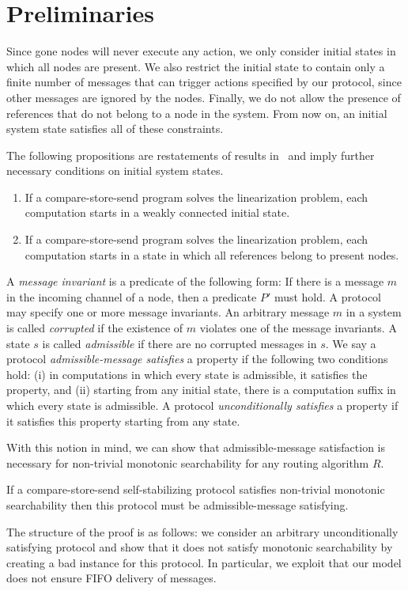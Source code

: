 \documentclass[a4paper,USenglish]{lipics}
\begin{document}
\section{Preliminaries}
\label{sec:preliminaries}

Since gone nodes will never execute any action, we only consider initial states in which all nodes are present. 
We also restrict the initial state to contain only a finite number of messages that can trigger actions specified by our protocol, since other messages are ignored by the nodes. 
Finally, we do not allow the presence of references that do not belong to a node in the system.
From now on, an initial system state satisfies all of these constraints.

The following propositions are restatements of results in~\cite{corona} and imply further necessary conditions on initial system states.
\begin{enumerate}
\item If a compare-store-send program solves the linearization problem, each computation starts in a weakly connected initial state.
\item If a compare-store-send program solves the linearization problem, each computation starts in a state in which all references belong to present nodes.
\end{enumerate}

A \emph{message invariant} is a predicate of the following form:
If there is a message $m$ in the incoming channel of a node, then a predicate $P'$ must hold.
A protocol may specify one or more message invariants.
An arbitrary message $m$ in a system is called \emph{corrupted} if the existence of $m$ violates one of the message invariants.
A state $s$ is called \emph{admissible} if there are no corrupted messages in $s$.
We say a protocol \emph{admissible-message satisfies} a property if the following two conditions hold: (i) in computations in which every state is admissible, it satisfies the property, and (ii) starting from any initial state, there is a computation suffix in which every state is admissible.
A protocol \emph{unconditionally satisfies} a property if it satisfies this property starting from any state.

With this notion in mind, we can show that admissible-message satisfaction is necessary for non-trivial monotonic searchability for any routing algorithm $R$.

\begin{lemma}\label{lem:admissible_message_necessary_for_monotonic_searchability}
If a compare-store-send self-stabilizing protocol satisfies non-trivial monotonic searchability then this protocol must be admissible-message satisfying.
\end{lemma}
The structure of the proof is as follows: we consider an arbitrary unconditionally satisfying protocol and show that it does not satisfy monotonic searchability by creating a bad instance for this protocol.
In particular, we exploit that our model does not ensure FIFO delivery of messages.
\end{document}
